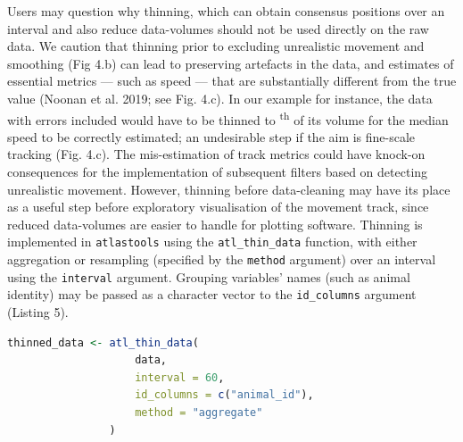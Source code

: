 \documentclass[10pt,paper=a4,headings=standardclasses
]{scrartcl}
\begin{document}
Users may question why thinning, which can obtain consensus positions over an interval and also reduce data-volumes should not be used directly on the raw data.
We caution that thinning prior to excluding unrealistic movement and smoothing (Fig 4.b) can lead to preserving artefacts in the data, and estimates of essential metrics --- such as speed --- that are substantially different from the true value (Noonan et al. 2019; see Fig. 4.c).
In our example for instance, the data with errors included would have to be thinned to \textsuperscript{th} of its volume for the median speed to be correctly estimated; an undesirable step if the aim is fine-scale tracking (Fig. 4.c).
The mis-estimation of track metrics could have knock-on consequences for the implementation of subsequent filters based on detecting unrealistic movement.
However, thinning before data-cleaning may have its place as a useful step before exploratory visualisation of the movement track, since reduced data-volumes are easier to handle for plotting software.
%
Thinning is implemented in \texttt{atlastools} using the \texttt{atl\_thin\_data} function, with either aggregation or resampling (specified by the \texttt{method} argument) over an interval using the \texttt{interval} argument.
Grouping variables' names (such as animal identity) may be passed as a character vector to the \texttt{id\_columns} argument (Listing 5).

\begin{lstlisting}[float, language=R, style=customR, caption = {Code to thin data by aggregation in \texttt{atlastools}. The method can be either "aggregate" or "resample". 
The time interval is specified in seconds, while the \texttt{id\_columns} allows a character vector of column names to be passed to the function, with these columns used as identity variables.
Both methods return a dataset with one rows per time-interval.}]
thinned_data <- atl_thin_data(
                    data,
                    interval = 60,
                    id_columns = c("animal_id"),
                    method = "aggregate"
                )
\end{lstlisting}
\end{document}
